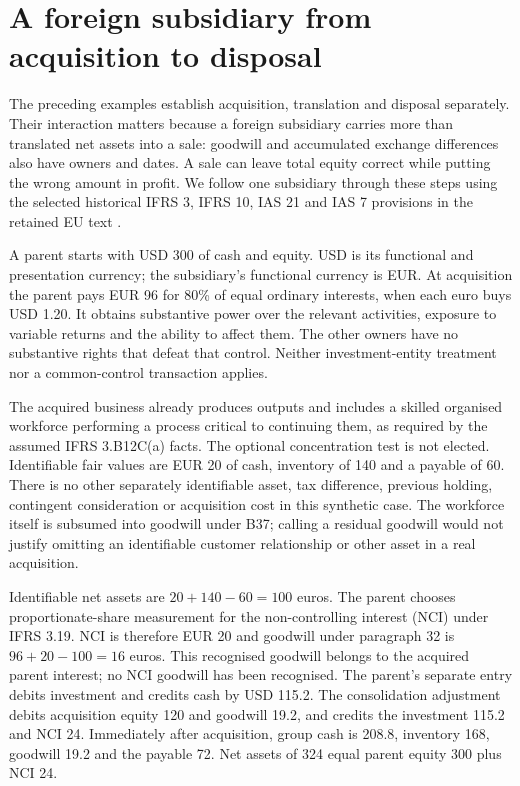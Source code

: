 \section{A foreign subsidiary from acquisition to disposal}
\label{sec:group-fx-disposal}

The preceding examples establish acquisition, translation and disposal
separately. Their interaction matters because a foreign subsidiary carries
more than translated net assets into a sale: goodwill and accumulated exchange
differences also have owners and dates. A sale can leave total equity correct
while putting the wrong amount in profit. We follow one subsidiary through
these steps using the selected historical IFRS 3, IFRS 10, IAS 21 and IAS 7
provisions in the retained EU text \citep{eu20231803}.

A parent starts with USD 300 of cash and equity. USD is its functional and
presentation currency; the subsidiary's functional currency is EUR. At
acquisition the parent pays EUR 96 for 80\% of equal ordinary interests, when
each euro buys USD 1.20. It obtains substantive power over the relevant
activities, exposure to variable returns and the ability to affect them. The
other owners have no substantive rights that defeat that control. Neither
investment-entity treatment nor a common-control transaction applies.

The acquired business already produces outputs and includes a skilled
organised workforce performing a process critical to continuing them, as
required by the assumed IFRS 3.B12C(a) facts. The optional concentration test
is not elected. Identifiable fair values are EUR 20 of cash, inventory of
140 and a payable of 60. There is no other separately identifiable asset,
tax difference, previous holding, contingent consideration or acquisition cost
in this synthetic case. The workforce itself is subsumed into goodwill under
B37; calling a residual goodwill would not justify omitting an identifiable
customer relationship or other asset in a real acquisition.

Identifiable net assets are \(20+140-60=100\) euros. The parent chooses
proportionate-share measurement for the non-controlling interest (NCI) under
IFRS 3.19. NCI is therefore EUR 20 and goodwill under paragraph 32 is
\(96+20-100=16\) euros. This recognised goodwill belongs to the acquired
parent interest; no NCI goodwill has been recognised. The parent's separate
entry debits investment and credits cash by USD 115.2. The consolidation
adjustment debits acquisition equity 120 and goodwill 19.2, and credits the
investment 115.2 and NCI 24. Immediately after acquisition, group cash is
208.8, inventory 168, goodwill 19.2 and the payable 72. Net assets of 324
equal parent equity 300 plus NCI 24.

